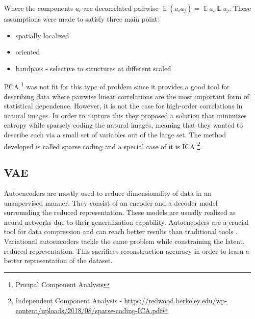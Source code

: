 \documentclass[12pt, english]{article}
\DeclareMathOperator*{\E}{\mathbb{E}}
\begin{document}
\vspace{4mm}

\par Where the components $a_{i}$ are decorrelated pairwise $\E (a_i a_j) = \E a_i \E a_j$. These assumptions were made to satisfy three main point:

\vspace{4mm}

\begin{itemize}
    \item spatially localized
    \item oriented
    \item bandpass - selective to structures at different scaled
\end{itemize}

\vspace{4mm}

\par PCA \footnote{Pricipal Component Analysis} was not fit for this type of problem since it provides a good tool for describing data where pairwise linear correlations are the most important form of statistical dependence. However, it is not the case for high-order correlations in natural images. In order to capture this they proposed a solution that minimizes entropy while sparsely coding the natural images, meaning that they wanted to describe each via a small set of variables out of the large set. The method developed is called sparse coding and a special case of it is ICA \footnote{Independent Component Analysis - \url{https://redwood.berkeley.edu/wp-content/uploads/2018/08/sparse-coding-ICA.pdf}}.

\vspace{5mm}

\subsection{VAE}

\vspace{5mm}

\par Autoencoders are mostly used to reduce dimensionality of data in an unsupervised manner. They consist of an encoder and a decoder model surrounding the reduced representation. These models are usually realized as neural networks due to their generalization capability. Autoencoders are a crucial tool for data compression and can reach better results than traditional tools \cite{theis2017lossy}. Variational autoencoders tackle the same problem while constraining the latent, reduced representation. This sacrifices reconstruction accuracy in order to learn a better representation of the dataset.
\end{document}
